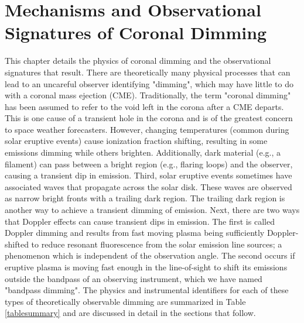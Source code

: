 \chapter{Mechanisms and Observational Signatures of Coronal Dimming}
\label{chaptermechanisms}

This chapter details the physics of coronal dimming and the observational signatures that result. There are theoretically many physical processes that can lead to an uncareful observer identifying "dimming", which may have little to do with a coronal mass ejection (CME). Traditionally, the term "coronal dimming" has been assumed to refer to the void left in the corona after a CME departs. This is one cause of a transient hole in the corona and is of the greatest concern to space weather forecasters. However, changing temperatures (common during solar eruptive events) cause ionization fraction shifting, resulting in some emissions dimming while others brighten. Additionally, dark material (e.g., a filament) can pass between a bright region (e.g., flaring loops) and the observer, causing a transient dip in emission. Third, solar eruptive events sometimes have associated waves that propagate across the solar disk. These waves are observed as narrow bright fronts with a trailing dark region. The trailing dark region is another way to achieve a transient dimming of emission. Next, there are two ways that Doppler effects can cause transient dips in emission. The first is called Doppler dimming and results from fast moving plasma being sufficiently Doppler-shifted to reduce resonant fluorescence from the solar emission line sources; a phenomenon which is independent of the observation angle. The second occurs if eruptive plasma is moving fast enough in the line-of-sight to shift its emissions outside the bandpass of an observing instrument, which we have named "bandpass dimming". The physics and instrumental identifiers for each of these types of theoretically observable dimming are summarized in Table \ref{tablesummary} and are discussed in detail in the sections that follow.

